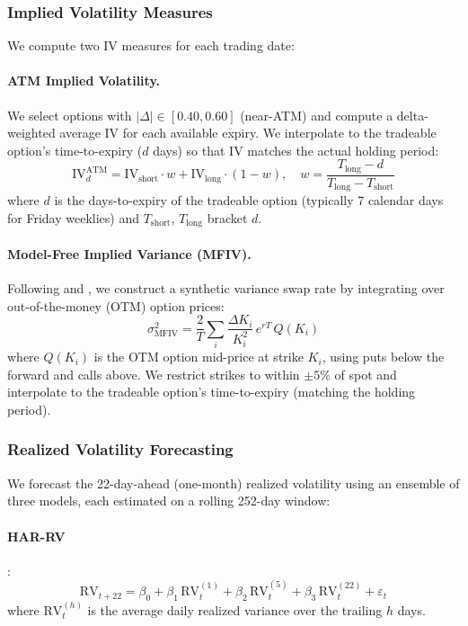 \documentclass[11pt,a4paper]{article}
\begin{document}
\subsubsection{Implied Volatility Measures}

We compute two IV measures for each trading date:

\paragraph{ATM Implied Volatility.}
We select options with $|\Delta| \in [0.40, 0.60]$ (near-ATM) and compute a delta-weighted average IV for each available expiry.
We interpolate to the tradeable option's time-to-expiry ($d$ days) so that IV matches the actual holding period:
\begin{equation}
    \text{IV}_d^{\text{ATM}} = \text{IV}_{\text{short}} \cdot w + \text{IV}_{\text{long}} \cdot (1 - w), \quad w = \frac{T_{\text{long}} - d}{T_{\text{long}} - T_{\text{short}}}
\end{equation}
where $d$ is the days-to-expiry of the tradeable option (typically 7 calendar days for Friday weeklies) and $T_{\text{short}}$, $T_{\text{long}}$ bracket $d$.

\paragraph{Model-Free Implied Variance (MFIV).}
Following \citet{carr1998towards} and \citet{demeterfi1999more}, we construct a synthetic variance swap rate by integrating over out-of-the-money (OTM) option prices:
\begin{equation}
    \sigma^2_{\text{MFIV}} = \frac{2}{T} \sum_i \frac{\Delta K_i}{K_i^2}\, e^{rT}\, Q(K_i) \label{eq:mfiv}
\end{equation}
where $Q(K_i)$ is the OTM option mid-price at strike $K_i$, using puts below the forward and calls above.
We restrict strikes to within $\pm 5\%$ of spot and interpolate to the tradeable option's time-to-expiry (matching the holding period).

\subsubsection{Realized Volatility Forecasting}

We forecast the 22-day-ahead (one-month) realized volatility using an ensemble of three models, each estimated on a rolling 252-day window:

\paragraph{HAR-RV} \citep{corsi2009simple}:
\begin{equation}
    \text{RV}_{t+22} = \beta_0 + \beta_1\, \text{RV}_t^{(1)} + \beta_2\, \text{RV}_t^{(5)} + \beta_3\, \text{RV}_t^{(22)} + \varepsilon_t
\end{equation}
where $\text{RV}_t^{(h)}$ is the average daily realized variance over the trailing $h$ days.
\end{document}
